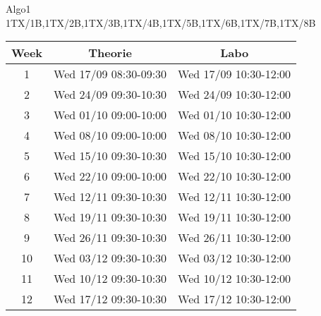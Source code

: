 \documentclass[a4paper]{article}
\newcommand{\week}[3]{
      #1 & #2 & #3 \\
      \hline
    }
\begin{document}
    \begin{center}
      {\Huge Algo1} \\[2mm]
      {\Large 1TX/1B,1TX/2B,1TX/3B,1TX/4B,1TX/5B,1TX/6B,1TX/7B,1TX/8B} \\
      \vfil\large
      \begin{tabular}{c|cc}
        \bf Week & \bf Theorie & \bf Labo \\
        \toprule
        \week{1}{Wed 17/09 08:30-09:30}{Wed 17/09 10:30-12:00}

\week{2}{Wed 24/09 09:30-10:30}{Wed 24/09 10:30-12:00}

\week{3}{Wed 01/10 09:00-10:00}{Wed 01/10 10:30-12:00}

\week{4}{Wed 08/10 09:00-10:00}{Wed 08/10 10:30-12:00}

\week{5}{Wed 15/10 09:30-10:30}{Wed 15/10 10:30-12:00}

\week{6}{Wed 22/10 09:00-10:00}{Wed 22/10 10:30-12:00}

\week{7}{Wed 12/11 09:30-10:30}{Wed 12/11 10:30-12:00}

\week{8}{Wed 19/11 09:30-10:30}{Wed 19/11 10:30-12:00}

\week{9}{Wed 26/11 09:30-10:30}{Wed 26/11 10:30-12:00}

\week{10}{Wed 03/12 09:30-10:30}{Wed 03/12 10:30-12:00}

\week{11}{Wed 10/12 09:30-10:30}{Wed 10/12 10:30-12:00}

\week{12}{Wed 17/12 09:30-10:30}{Wed 17/12 10:30-12:00}

      \end{tabular}
      \vfil
    \end{center}
    
\end{document}
